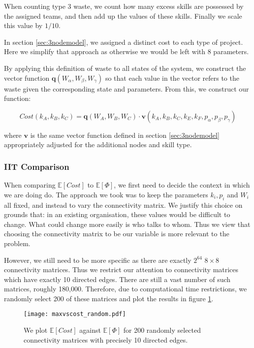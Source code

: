 When counting type 3 waste, we count how many excess skills are possessed by the assigned teams, and then add up the values of these skills. Finally we scale this value by $1/10$.

\begin{remark}
	In section \ref{sec:3nodemodel}, we assigned a distinct cost to each type of project. Here we simplify that approach as otherwise we would be left with 8 parameters.
\end{remark}

By applying this definition of waste to all states of the system, we construct the vector function $\mathbf{q}(W_\alpha, W_\beta, W_\gamma)$ so that each value in the vector refers to the waste given the corresponding state and parameters. From this, we construct our function:

\begin{equation}
\label{eq:cost_function}
Cost(k_A, k_B, k_C) = \mathbf{q}(W_A, W_B, W_C) \cdot \mathbf{v}(k_A, k_B, k_C,k_E, k_F, p_\alpha, p_\beta, p_\gamma)
\end{equation}

where $\mathbf{v}$ is the same vector function defined in section \ref{sec:3nodemodel} appropriately adjusted for the additional nodes and skill type.

\subsubsection{IIT Comparison}

When comparing $\mathbb{E}[Cost]$ to $\mathbb{E}[\Phi]$, we first need to decide the context in which we are doing do. The approach we took was to keep the parameters $k_i, p_i$ and $W_i$ all fixed, and instead to vary the connectivity matrix. We justify this choice on grounds that: in an existing organisation, these values would be difficult to change. What could change more easily is who talks to whom. Thus we view that choosing the connectivity matrix to be our variable is more relevant to the problem.

However, we still need to be more specific as there are exactly $2^{64}$ $8\times 8$ connectivity matrices. Thus we restrict our attention to connectivity matrices which have exactly 10 directed edges. There are still a vast number of such matrices, roughly 180,000. Therefore, due to computational time restrictions, we randomly select 200 of these matrices and plot the results in figure \ref{fig:model_costvsphi}.

\begin{figure}[h!]
	\centering
	\texttt{[image: maxvscost\_random.pdf]}
	\caption{We plot $\mathbb{E}[Cost]$ against $\mathbb{E}[\Phi]$ for 200 randomly selected connectivity matrices with precisely 10 directed edges.}
	\label{fig:model_costvsphi}
\end{figure}

